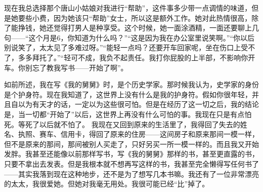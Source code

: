 现在我总选择那个唐山小姑娘对我进行“帮助”，这件事多少带一点调情的味道，但是她要些小费，因为她该只“帮助”女士，所以这是额外工作。她对此热情很高，除了能挣钱，她还觉得打男人是种享受。这个时候，她一面涂酒精，一面还要聊上几句——“这个月是6，你知道为什么吗？”“这是因为我在办公室里说笑啊。”“你以后别说笑了，太太见了多难过呀。”“能轻一点吗？还要开车回家呢，坐在伤口上受不了，多多拜托了。”“轻可不成，我负不起责任。我打你屁股的上半部，不影响你开车。你别忘了教我写书——开始了啊”。 

如前所述，我在写《我的舅舅》时，是个历史学家。那时候我认为，史学家的身份是个护身符。现在我知道了，这世界上没有什么是我的护身符。假如你很年轻，并且自以为有天才的话，一定以为这些很可怕。但是在经历了这一切之后，我的结论是，当一切都“开始了”以后，这世界上再没有什么可怕的事。我现在只是有点怕死。等死了以后就不怕了。 我现在又回到原来的生活里了，我得回了失去的姓名、执照、赛车、信用卡，得回了原来的住房——这间房子和原来那间一模一样，但不是原来的那间，那间被别人买走了，只好另买一所一模一样的。而且我又开始发胖。我甚至还能像以前那样写书，写《我的舅舅》那样的书，甚至更直露的书，只要不拿出去发表。但是我根本就不想再写这样的书，我甚至完全懒得写任何书了——其实我落到现在这种地步，还不是为了想写几本书嘛。我还有了一位非常漂亮的太太，我很爱她。但她对我毫无用处。我很可能已经“比”掉了。


